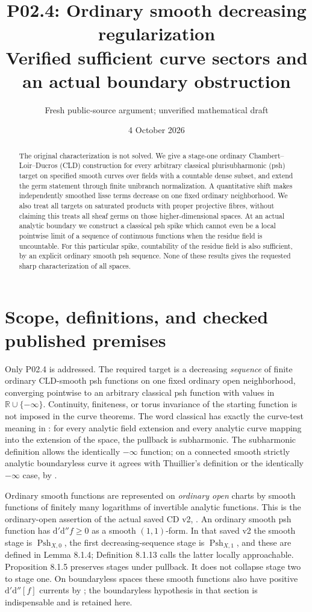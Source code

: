 \documentclass[11pt]{article}
\title{P02.4: Ordinary smooth decreasing regularization\\
Verified sufficient curve sectors and an actual boundary obstruction}
\author{Fresh public-source argument; unverified mathematical draft}
\date{4 October 2026}
\theoremstyle{remark}
\newcommand{\dd}{\mathrm d'\mathrm d''}
\newcommand{\Psh}{\operatorname{Psh}}
\begin{document}
\maketitle
\begin{abstract}
The original characterization is not solved. We give a stage-one ordinary
Chambert--Loir--Ducros (CLD) construction for every arbitrary classical
plurisubharmonic (psh) target on specified smooth curves over fields with a
countable dense subset, and extend the germ statement through finite unibranch
normalization. A quantitative shift makes independently smoothed lisse terms
decrease on one fixed ordinary neighborhood. We also treat all targets on
saturated products with proper projective fibres, without claiming this treats
all sheaf germs on those higher-dimensional spaces. At an actual analytic
boundary we construct a classical psh spike which cannot even be a local
pointwise limit of a sequence of continuous functions when the residue field
is uncountable. For this particular spike, countability of the residue field
is also sufficient, by an explicit ordinary smooth psh sequence. None of these
results gives the requested sharp characterization of all spaces.
\end{abstract}

\section{Scope, definitions, and checked published premises}
Only P02.4 is addressed. The required target is a decreasing \emph{sequence}
of finite ordinary CLD-smooth psh functions on one fixed ordinary open
neighborhood, converging pointwise to an arbitrary classical psh function
with values in $\mathbb R\cup\{-\infty\}$. Continuity, finiteness, or torus
invariance of the starting function is not imposed in the curve theorems.
The word classical has exactly the curve-test meaning in
\cite[Definition 4.1]{GR}: for every analytic field extension and every
analytic curve mapping into the extension of the space, the pullback is
subharmonic. The subharmonic definition allows the identically
$-\infty$ function; on a connected smooth strictly analytic boundaryless
curve it agrees with Thuillier's definition or the identically $-\infty$
case, by \cite[3.4.2 and 4.1.2]{GR}.

Ordinary smooth functions are represented on \emph{ordinary open} charts by
smooth functions of finitely many logarithms of invertible analytic functions.
This is the ordinary-open assertion of the actual saved CD v2,
\cite[Proposition 15.1.1(b), Corollary 15.1.2]{CD}. An ordinary smooth psh
function has $\dd f\geq0$ as a smooth $(1,1)$-form. In that saved v2 the
smooth stage is $\Psh_{X,0}$, the first decreasing-sequence stage is
$\Psh_{X,1}$, and these are defined in Lemma 8.1.4; Definition 8.1.13 calls
the latter locally approachable. Proposition 8.1.5 preserves stages under
pullback. It does not collapse stage two to stage one. On boundaryless
spaces these smooth functions also have positive $\dd[f]$ currents by
\cite[\S8.3, Proposition 8.3.1]{CD}; the boundaryless hypothesis in that
section is indispensable and is retained here.
\end{document}
